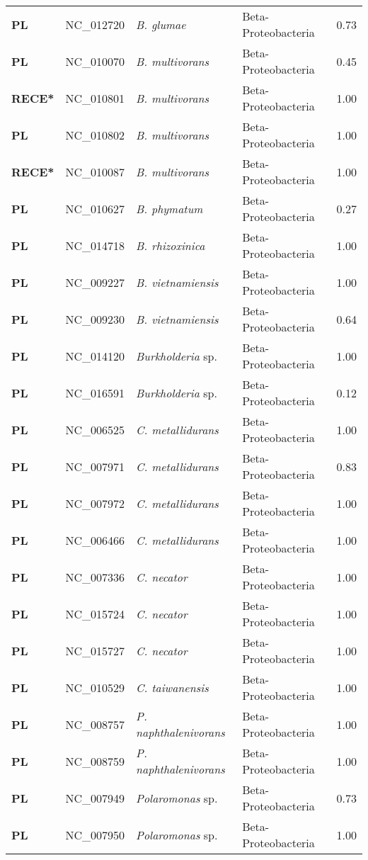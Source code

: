 \begin{adjustwidth}{-3cm}{2cm}
{\begin{supertabular}{>{\bfseries}l|p{0.1\textwidth}p{0.14\textwidth}l|l}
PL & NC\_012720 & \textit{B. glumae} & Beta-Proteobacteria & 0.73\\
PL & NC\_010070 & \textit{B. multivorans} & Beta-Proteobacteria & 0.45\\
RECE* & NC\_010801 & \textit{B. multivorans} & Beta-Proteobacteria & 1.00\\
PL & NC\_010802 & \textit{B. multivorans} & Beta-Proteobacteria & 1.00\\
RECE* & NC\_010087 & \textit{B. multivorans} & Beta-Proteobacteria & 1.00\\
PL & NC\_010627 & \textit{B. phymatum} & Beta-Proteobacteria & 0.27\\
PL & NC\_014718 & \textit{B. rhizoxinica} & Beta-Proteobacteria & 1.00\\
PL & NC\_009227 & \textit{B. vietnamiensis} & Beta-Proteobacteria & 1.00\\
PL & NC\_009230 & \textit{B. vietnamiensis} & Beta-Proteobacteria & 0.64\\
PL & NC\_014120 & \textit{Burkholderia} sp. & Beta-Proteobacteria & 1.00\\
PL & NC\_016591 & \textit{Burkholderia} sp. & Beta-Proteobacteria & 0.12\\
PL & NC\_006525 & \textit{C. metallidurans} & Beta-Proteobacteria & 1.00\\
PL & NC\_007971 & \textit{C. metallidurans} & Beta-Proteobacteria & 0.83\\
PL & NC\_007972 & \textit{C. metallidurans} & Beta-Proteobacteria & 1.00\\
PL & NC\_006466 & \textit{C. metallidurans} & Beta-Proteobacteria & 1.00\\
PL & NC\_007336 & \textit{C. necator} & Beta-Proteobacteria & 1.00\\
PL & NC\_015724 & \textit{C. necator} & Beta-Proteobacteria & 1.00\\
PL & NC\_015727 & \textit{C. necator} & Beta-Proteobacteria & 1.00\\
PL & NC\_010529 & \textit{C. taiwanensis} & Beta-Proteobacteria & 1.00\\
PL & NC\_008757 & \textit{P. naphthalenivorans} & Beta-Proteobacteria & 1.00\\
PL & NC\_008759 & \textit{P. naphthalenivorans} & Beta-Proteobacteria & 1.00\\
PL & NC\_007949 & \textit{Polaromonas} sp. & Beta-Proteobacteria & 0.73\\
PL & NC\_007950 & \textit{Polaromonas} sp. & Beta-Proteobacteria & 1.00\\

\end{supertabular}}
\end{adjustwidth}
